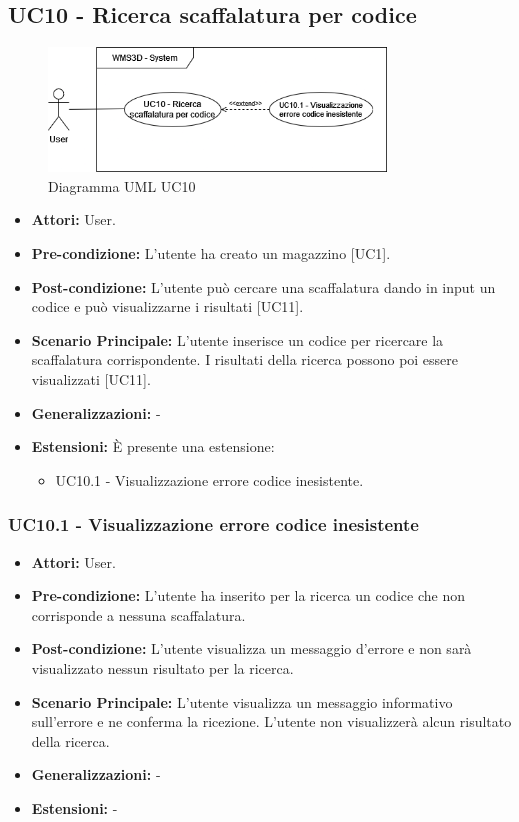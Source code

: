 \subsection{UC10 - Ricerca scaffalatura per codice}
\begin{figure}[H]
  \centering
  \includegraphics[width=0.8\textwidth]{UC_diagrams_1-10/UC10.drawio.png}
   \caption{Diagramma UML UC10}
\end{figure}
\begin{itemize}
    \item \textbf{Attori:} User.
    \item \textbf{Pre-condizione:} L'utente ha creato un magazzino [UC1].
    \item \textbf{Post-condizione:} L'utente può cercare una scaffalatura dando in input un codice e può visualizzarne i risultati [UC11].
    \item \textbf{Scenario Principale:} L'utente inserisce un codice per ricercare la scaffalatura corrispondente. I risultati della ricerca possono poi essere visualizzati [UC11].
    \item \textbf{Generalizzazioni:} -
    \item \textbf{Estensioni:} È presente una estensione:
    \begin{itemize}
        \item UC10.1 - Visualizzazione errore codice inesistente.
    \end{itemize}
\end{itemize}


\subsubsection{UC10.1 - Visualizzazione errore codice inesistente}
\begin{itemize}
    \item \textbf{Attori:} User.
    \item \textbf{Pre-condizione:}  L'utente ha inserito per la ricerca un codice che non corrisponde a nessuna scaffalatura.
    \item \textbf{Post-condizione:}  L'utente visualizza un messaggio d'errore e non sarà visualizzato nessun risultato per la ricerca.
    \item \textbf{Scenario Principale:}  L'utente visualizza un messaggio informativo sull'errore e ne conferma la ricezione. L'utente non visualizzerà alcun risultato della ricerca.
    \item \textbf{Generalizzazioni:} -
    \item \textbf{Estensioni:} -
\end{itemize}